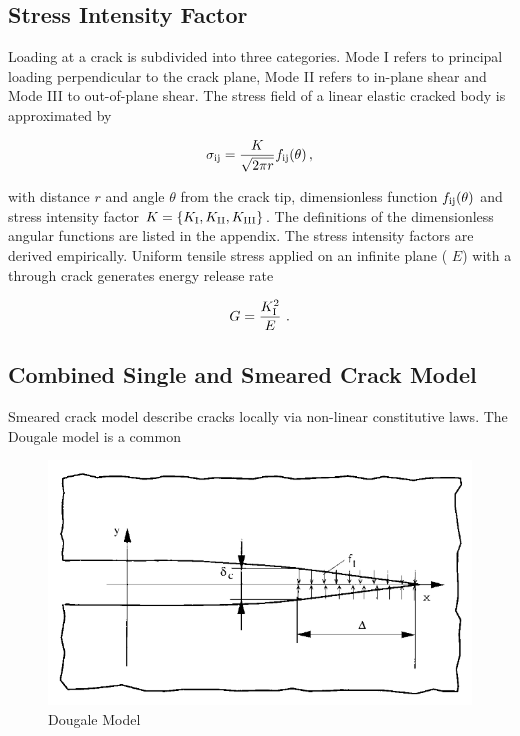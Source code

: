 \documentclass[format=acmtog, 12pt, screen=true, review=false]{acmart}
\begin{document}
\subsection{Stress Intensity Factor}

Loading at a crack is subdivided into three categories. Mode I refers to principal loading perpendicular to the crack plane, Mode II refers to in-plane shear and Mode III to out-of-plane shear. The stress field of a linear elastic cracked body is approximated by

\begin{equation}
    \sigma_{\rm{ij}}=\frac{K}{\sqrt{2\pi r}}f_{\rm{ij}}(\theta)\,,
\end{equation}

with distance $r$ and angle $\theta$ from the crack tip, dimensionless function $f_{\rm{ij}}(\theta)$ and stress intensity factor $K=\{K_{\rm{I}},K_{\rm{II}},K_{\rm{III}}\}$. The definitions of the dimensionless angular functions are listed in the appendix. The stress intensity factors \cite{And05, Xu11} are derived empirically. Uniform tensile stress applied on an infinite plane ( $E$) with a through crack generates energy release rate

\begin{equation}
    G = \frac{K_{\rm{I}}^2}{E}\,\,.
\end{equation}

\subsection{Combined Single and Smeared Crack Model}

Smeared crack model describe cracks locally via non-linear constitutive laws. The Dougale model is a common  

\begin{figure}[h]
  \centering
  \label{fig:Douglas}
  \includegraphics[width=\linewidth]{Dougale.PNG}
  \caption{Dougale Model \cite{Lat15}}
\end{figure}
\end{document}
